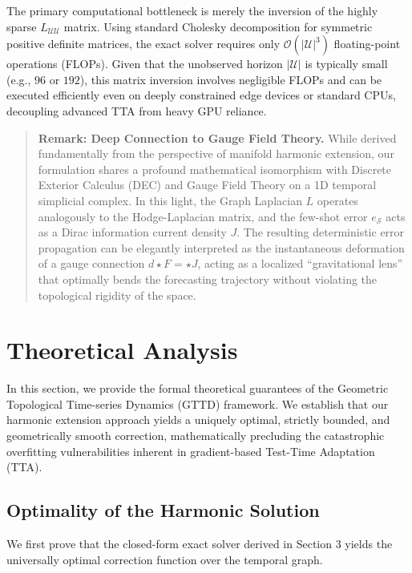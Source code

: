 \documentclass{article}
\begin{document}
The primary computational bottleneck is merely the inversion of the highly sparse $L_{\mathcal{UU}}$ matrix. Using standard Cholesky decomposition for symmetric positive definite matrices, the exact solver requires only $\mathcal{O}(|\mathcal{U}|^3)$ floating-point operations (FLOPs). Given that the unobserved horizon $|\mathcal{U}|$ is typically small (e.g., $96$ or $192$), this matrix inversion involves negligible FLOPs and can be executed efficiently even on deeply constrained edge devices or standard CPUs, decoupling advanced TTA from heavy GPU reliance.

\begin{quote}
    \textbf{Remark: Deep Connection to Gauge Field Theory.} While derived fundamentally from the perspective of manifold harmonic extension, our formulation shares a profound mathematical isomorphism with Discrete Exterior Calculus (DEC) and Gauge Field Theory on a 1D temporal simplicial complex. In this light, the Graph Laplacian $L$ operates analogously to the Hodge-Laplacian matrix, and the few-shot error $e_{\mathcal{S}}$ acts as a Dirac information current density $J$. The resulting deterministic error propagation can be elegantly interpreted as the instantaneous deformation of a gauge connection $d \star F = \star J$, acting as a localized ``gravitational lens'' that optimally bends the forecasting trajectory without violating the topological rigidity of the space.
\end{quote}

\section{Theoretical Analysis}

In this section, we provide the formal theoretical guarantees of the Geometric Topological Time-series Dynamics (GTTD) framework. We establish that our harmonic extension approach yields a uniquely optimal, strictly bounded, and geometrically smooth correction, mathematically precluding the catastrophic overfitting vulnerabilities inherent in gradient-based Test-Time Adaptation (TTA).

\subsection{Optimality of the Harmonic Solution}

We first prove that the closed-form exact solver derived in Section 3 yields the universally optimal correction function over the temporal graph.
\end{document}
